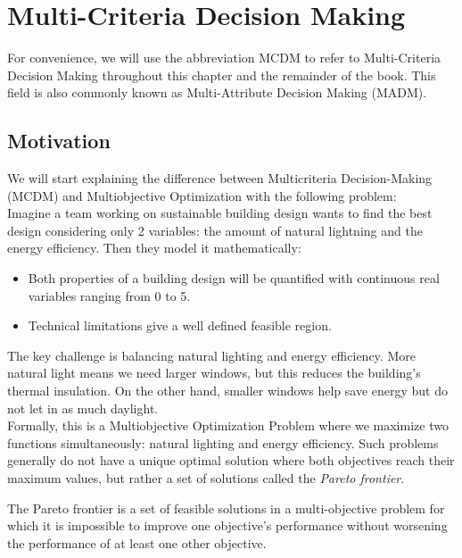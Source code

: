 \chapter{Multi-Criteria Decision Making}

For convenience, we will use the abbreviation MCDM to refer to Multi-Criteria Decision Making throughout this chapter and the remainder of the book. This field is also commonly known as Multi-Attribute Decision Making (MADM).



\section*{Motivation}
We will start explaining the difference between Multicriteria Decision-Making (MCDM) and Multiobjective Optimization with the following problem:\\

Imagine a team working on \textnormal{sustainable building design} wants to find the best design considering only 2 variables: the amount of natural lightning and the energy efficiency. Then they model it mathematically:\vspace{-0.7em}
\begin{itemize}
    \item Both properties of a building design will be quantified with continuous real variables ranging from 0 to 5.\vspace{-0.8em}
    \item Technical limitations give a well defined feasible region.\vspace{-0.7em}
\end{itemize}
The key challenge is balancing natural lighting and energy efficiency. More natural light means we need larger windows, but this reduces the building's thermal insulation. On the other hand, smaller windows help save energy but do not let in as much daylight.\\

Formally, this is a Multiobjective Optimization Problem where we maximize two functions simultaneously: natural lighting and energy efficiency. Such problems generally do not have a unique optimal solution where both objectives reach their maximum values, but rather a set of solutions called the \textit{Pareto frontier}. 


\begin{definition}
The Pareto frontier is a set of feasible solutions in a multi-objective problem for which it is impossible to improve one objective's performance without worsening the performance of at least one other objective.
\end{definition}


